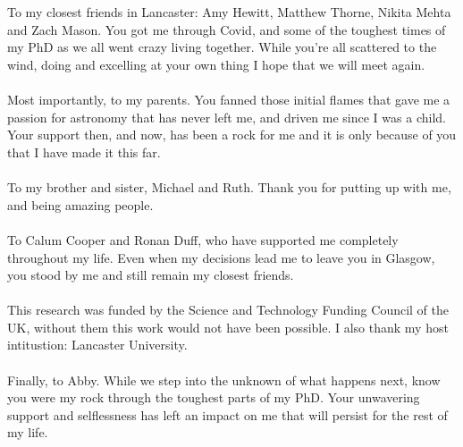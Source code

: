\begin{acknowledgements}
\\
\\
To my closest friends in Lancaster: Amy Hewitt, Matthew Thorne, Nikita Mehta and Zach Mason. You got me through Covid, and some of the toughest times of my PhD as we all went crazy living together. While you're all scattered to the wind, doing and excelling at your own thing I hope that we will meet again.
\\
\\
Most importantly, to my parents. You fanned those initial flames that gave me a passion for astronomy that has never left me, and driven me since I was a child. Your support then, and now, has been a rock for me and it is only because of you that I have made it this far.
\\
\\
To my brother and sister, Michael and Ruth. Thank you for putting up with me, and being amazing people.
\\
\\
To Calum Cooper and Ronan Duff, who have supported me completely throughout my life. Even when my decisions lead me to leave you in Glasgow, you stood by me and still remain my closest friends.
\\
\\
This research was funded by the Science and Technology Funding Council of the UK, without them this work would not have been possible. I also thank my host intitustion: Lancaster University.
\\
\\
Finally, to Abby. While we step into the unknown of what happens next, know you were my rock through the toughest parts of my PhD. Your unwavering support and selflessness has left an impact on me that will persist for the rest of my life.




\end{acknowledgements}




